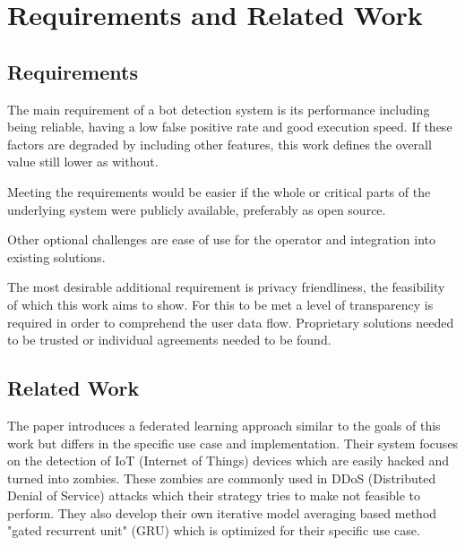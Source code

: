 \documentclass[
    fontsize=12pt,
    headings=small,
    parskip=half,           %
    bibliography=totoc,
    numbers=noenddot,       %
    open=any,               %
    final                   %
]{scrreprt}
\begin{document}
\chapter{Requirements and Related Work}


\section{Requirements}

The main requirement of a bot detection system is its performance including being reliable, having a low false positive rate and good execution speed. If these factors are degraded by including other features, this work defines the overall value still lower as without.

Meeting the requirements would be easier if the whole or critical parts of the underlying system were publicly available, preferably as open source.

Other optional challenges are ease of use for the operator and integration into existing solutions.

The most desirable additional requirement is privacy friendliness, the feasibility of which this work aims to show. For this to be met a level of transparency is required in order to comprehend the user data flow. Proprietary solutions needed to be trusted or individual agreements needed to be found.


\section{Related Work}

The paper \cite{LiJi2021} introduces a federated learning approach similar to the goals of this work but differs in the specific use case and implementation. Their system focuses on the detection of IoT (Internet of Things) devices which are easily hacked and turned into zombies. These zombies are commonly used in DDoS (Distributed Denial of Service) attacks which their strategy tries to make not feasible to perform. They also develop their own iterative model averaging based method "gated recurrent unit" (GRU) which is optimized for their specific use case.
\end{document}
